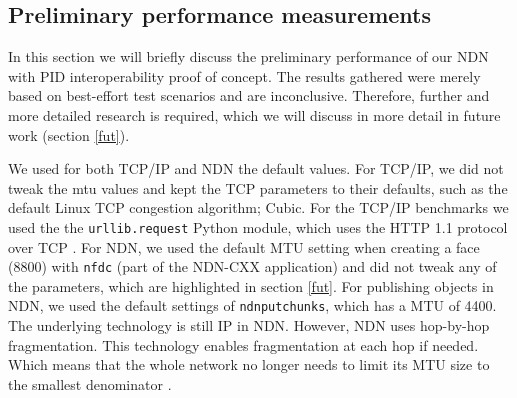 

\subsection{Preliminary performance measurements}
\label{discussion-performance}
In this section we will briefly discuss the preliminary performance of our NDN with PID interoperability proof of concept. The results gathered were merely based on best-effort test scenarios and are inconclusive. Therefore, further and more detailed research is required, which we will discuss in more detail in future work (section \ref{fut}). 


We used for both TCP/IP and NDN the default values.
For TCP/IP, we did not tweak the \gls{mtu} values and kept the TCP parameters to their defaults, such as the default Linux TCP congestion algorithm; Cubic. For the TCP/IP benchmarks we used the the \texttt{urllib.request} Python module, which uses the HTTP 1.1 protocol over TCP \cite{urllib}. For NDN, we used the default MTU setting when creating a face (8800) with \texttt{nfdc} (part of the NDN-CXX application) and did not tweak any of the parameters, which are highlighted in section \ref{fut}. For publishing objects in NDN, we used the default settings of \texttt{ndnputchunks}, which has a MTU of 4400. The underlying technology is still IP in NDN. However, NDN uses hop-by-hop fragmentation. This technology enables fragmentation at each hop if needed. Which means that the whole network no longer needs to limit its MTU size to the smallest denominator \cite{ndn-mtu}.

